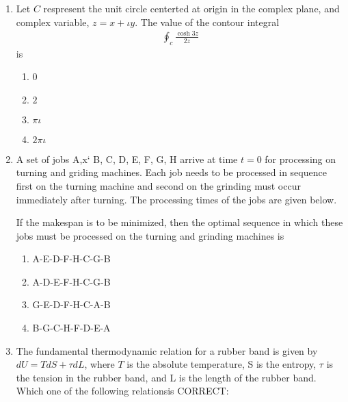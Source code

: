 \documentclass[journal]{IEEEtran}
\numberwithin{equation}{enumi}
\numberwithin{figure}{enumi}
\begin{document}
\begin{enumerate}
	\item Let $C$ respresent the unit circle centerted at origin in the complex plane, and complex variable, $ z = x + \iota y$. The value of the contour integral 
		\begin{align*}
			\oint_{c} \frac{\cosh{3z}}{2z} 
		\end{align*}
	 is

		\hfill{}

		\begin{multicols}{4}
			\begin{enumerate}
				\item 0 
				\item $2$
				\item $\pi\iota$
				\item $2\pi\iota$
			\end{enumerate}
		\end{multicols}

	\item A set of jobs A,x` B, C, D, E, F, G, H arrive at time $ t = 0 $ for processing on turning and griding machines. Each job needs to be processed in sequence first on the turning machine and second on the grinding must occur immediately after turning. The processing times of the jobs are given below. 
		\begin{table}
			\centering
			
		\end{table}
	If the makespan is to be minimized, then the optimal sequence in which these jobs must be processed on the turning and grinding machines is 
		
		\hfill{}

		\begin{multicols}{2}
			\begin{enumerate}
				\item A-E-D-F-H-C-G-B
				\item A-D-E-F-H-C-G-B
				\item G-E-D-F-H-C-A-B
				\item B-G-C-H-F-D-E-A
			\end{enumerate}
		\end{multicols}

	\item The fundamental thermodynamic relation for a rubber band is given by $dU = TdS + \tau dL$, where $T$ is the absolute temperature, S is the entropy, $\tau$ is the tension in the rubber band, and L is the length of the rubber band. Which one of the following relationsis CORRECT:
		

\end{enumerate}
\end{document}
